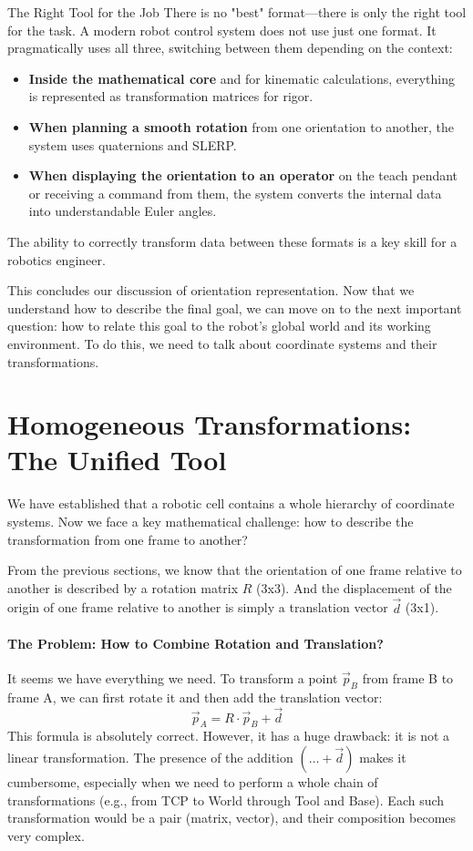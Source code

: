 \begin{navigationbox}{The Right Tool for the Job}
There is no "best" format—there is only the right tool for the task. A modern robot control system does not use just one format. It pragmatically uses all three, switching between them depending on the context:
\begin{itemize}
    \item \textbf{Inside the mathematical core} and for kinematic calculations, everything is represented as transformation matrices for rigor.
    \item \textbf{When planning a smooth rotation} from one orientation to another, the system uses quaternions and SLERP.
    \item \textbf{When displaying the orientation to an operator} on the teach pendant or receiving a command from them, the system converts the internal data into understandable Euler angles.
\end{itemize}
The ability to correctly transform data between these formats is a key skill for a robotics engineer.
\end{navigationbox}

This concludes our discussion of orientation representation. Now that we understand how to describe the final goal, we can move on to the next important question: how to relate this goal to the robot's global world and its working environment. To do this, we need to talk about coordinate systems and their transformations.

\section{Homogeneous Transformations: The Unified Tool}
\label{sec:homogeneous_transforms}

We have established that a robotic cell contains a whole hierarchy of coordinate systems. Now we face a key mathematical challenge: how to describe the transformation from one frame to another?

From the previous sections, we know that the orientation of one frame relative to another is described by a rotation matrix $R$ (3x3). And the displacement of the origin of one frame relative to another is simply a translation vector $\vec{d}$ (3x1).

\paragraph{The Problem: How to Combine Rotation and Translation?}
It seems we have everything we need. To transform a point $\vec{p}_B$ from frame B to frame A, we can first rotate it and then add the translation vector:
$$ \vec{p}_A = R \cdot \vec{p}_B + \vec{d} $$
This formula is absolutely correct. However, it has a huge drawback: it is not a linear transformation. The presence of the addition $(\dots + \vec{d})$ makes it cumbersome, especially when we need to perform a whole chain of transformations (e.g., from TCP to World through Tool and Base). Each such transformation would be a pair (matrix, vector), and their composition becomes very complex.


